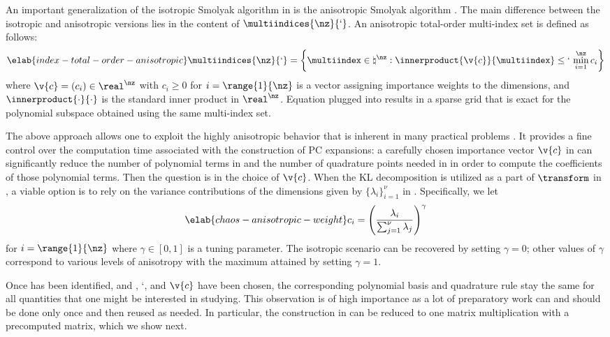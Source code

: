 An important generalization of the isotropic Smolyak algorithm in
 is the anisotropic Smolyak algorithm
\cite{nobile2008}. The main difference between the isotropic and anisotropic
versions lies in the content of $\multiindices{\nz}{\lq}$. An anisotropic
total-order multi-index set is defined as follows:
\begin{equation} \elab{index-total-order-anisotropic}
  \multiindices{\nz}{\lq} = \left\{ \multiindex \in \natural^\nz: \innerproduct{\v{c}}{\multiindex} \leq \lq \, \min_{i = 1}^\nz c_i \right\}
\end{equation}
where $\v{c} = (c_i) \in \real^\nz$ with $c_i \geq 0$ for $i = \range{1}{\nz}$
is a vector assigning importance weights to the dimensions, and
$\innerproduct{\cdot}{\cdot}$ is the standard inner product in $\real^\nz$.
Equation  plugged into
 results in a sparse grid that is exact for the
polynomial subspace obtained using the same multi-index set.

The above approach allows one to exploit the highly anisotropic behavior that is
inherent in many practical problems \cite{nobile2008}. It provides a fine
control over the computation time associated with the construction of \ac{PC}
expansions: a carefully chosen importance vector $\v{c}$ in
 can significantly reduce the number of
polynomial terms in  and the number of quadrature points
needed in  in order to compute the coefficients of those
polynomial terms. Then the question is in the choice of $\v{c}$. When the
\ac{KL} decomposition is utilized as a part of $\transform$ in
, a viable option is to rely on the variance contributions
of the dimensions given by $\{ \lambda_i \}_{i = 1}^\nu$ in
. Specifically, we let
\begin{equation} \elab{chaos-anisotropic-weight}
  c_i = \left(\frac{\lambda_i}{\sum_{j = 1}^\nu \lambda_j}\right)^\gamma
\end{equation}
for $i = \range{1}{\nz}$ where $\gamma \in [0, 1]$ is a tuning parameter. The
isotropic scenario can be recovered by setting $\gamma = 0$; other values of
$\gamma$ correspond to various levels of anisotropy with the maximum attained by
setting $\gamma = 1$.

Once \vz has been identified, and \lc, \lq, and $\v{c}$ have been chosen, the
corresponding polynomial basis and quadrature rule stay the same for all
quantities that one might be interested in studying. This observation is of high
importance as a lot of preparatory work can and should be done only once and
then reused as needed. In particular, the construction in 
can be reduced to one matrix multiplication with a precomputed matrix, which we
show next.

